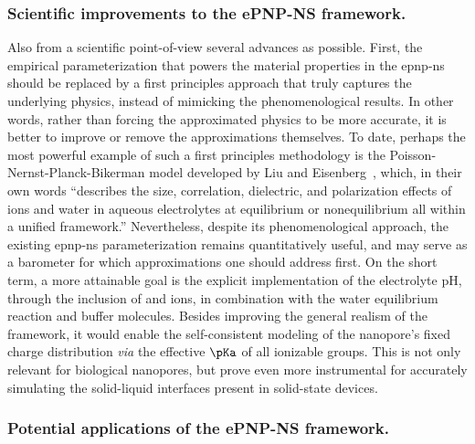 \subsubsection{Scientific improvements to the {ePNP-NS} framework.}
%

Also from a scientific point-of-view several advances as possible. First, the empirical parameterization that
powers the material properties in the \gls{epnp-ns} should be replaced by a first principles approach that
truly captures the underlying physics, instead of mimicking the phenomenological results. In other words,
rather than forcing the approximated physics to be more accurate, it is better to improve or remove the
approximations themselves. To date, perhaps the most powerful example of such a first principles methodology
is the Poisson-Nernst-Planck-Bikerman model developed by Liu and Eisenberg~\cite{Liu-2020}, which, in their
own words ``describes the size, correlation, dielectric, and polarization effects of ions and water in aqueous
electrolytes at equilibrium or nonequilibrium all within a unified framework.'' Nevertheless, despite its
phenomenological approach, the existing \gls{epnp-ns} parameterization remains quantitatively useful, and may
serve as a barometer for which approximations one should address first. On the short term, a more attainable
goal is the explicit implementation of the electrolyte pH, through the inclusion of  and  ions,
in combination with the water equilibrium reaction and buffer molecules. Besides improving the general realism
of the framework, it would enable the self-consistent modeling of the nanopore's fixed charge distribution
\textit{via} the effective $\pKa$ of all ionizable groups. This is not only relevant for biological nanopores,
but prove even more instrumental for accurately simulating the solid-liquid interfaces present in solid-state
devices.


\subsubsection{Potential applications of the {ePNP-NS} framework.}
%

